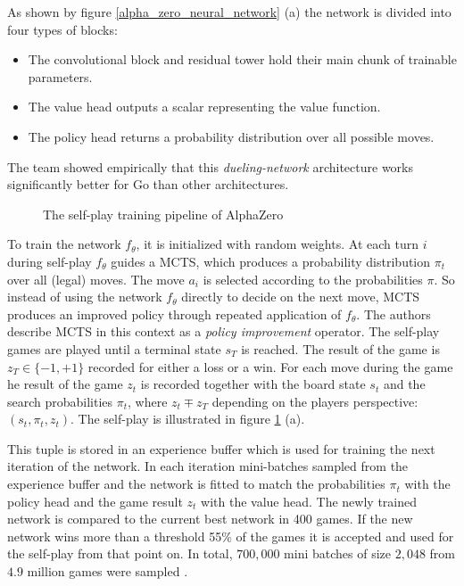 As shown by figure \ref{alpha_zero_neural_network} (a) the network is divided into four types of blocks:

\begin{itemize}
    \item The convolutional block and residual tower hold their main chunk of trainable parameters.
    \item The value head outputs a scalar representing the value function.
    \item The policy head returns a probability distribution over all possible moves.
\end{itemize}

The team showed empirically \cite[p. 9]{silver_mastering_2017} that this \textit{dueling-network} \cite{wang_dueling_2016} architecture works significantly better for Go than other architectures.

\begin{figure}[!h]
    \centering
    \caption{The self-play training pipeline of AlphaZero \cite[p. 5]{silver_mastering_2017}}
    \label{alpha_zero_training}
\end{figure}

To train the network $f_{\theta}$, it is initialized with random weights. At each turn $i$ during self-play $f_{\theta}$ guides a MCTS, which produces a probability distribution $\pi_t$ over all (legal) moves. The move $a_i$ is selected according to the probabilities $\pi$. So instead of using the network $f_{\theta}$ directly to decide on the next move, MCTS produces an improved policy through repeated application of $f_{\theta}$. The authors describe MCTS in this context as a \textit{policy improvement} operator. The self-play games are played until a terminal state $s_T$ is reached. The result of the game is $z_T \in \{-1, +1\}$ recorded for either a loss or a win. For each move during the game he result of the game $z_t$ is recorded together with the board state $s_t$ and the search probabilities $\pi_t$, where $z_t \mp z_T $ depending on the players perspective: $(s_t, \pi_t, z_t)$. The self-play is illustrated in figure \ref{alpha_zero_training} (a).

This tuple is stored in an experience buffer which is used for training the next iteration of the network. In each iteration mini-batches sampled from the experience buffer and the network is fitted to match the probabilities $\pi_t$ with the policy head and the game result $z_t$ with the value head. The newly trained network is compared to the current best network in 400 games. If the new network wins more than a threshold 55\% of the games it is accepted and used for the self-play from that point on. In total, $700,000$ mini batches of size $2,048$ from $4.9$ million games were sampled \cite[p. 6]{silver_mastering_2017}.

